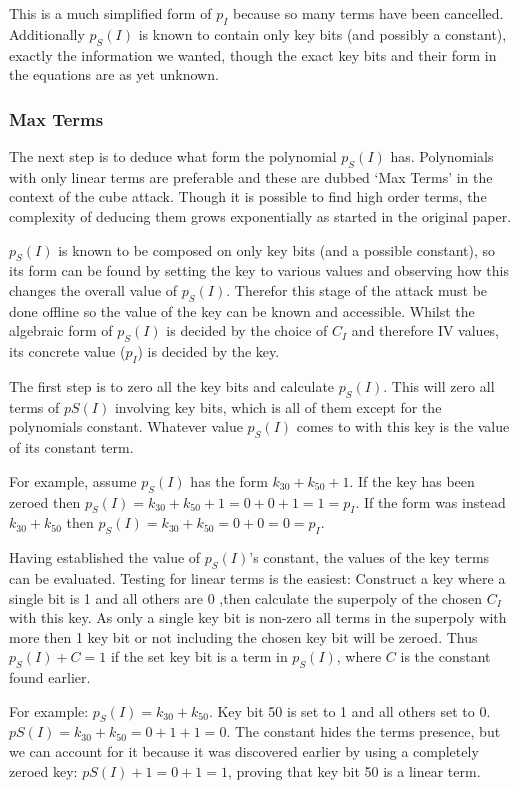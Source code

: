 \documentclass{report}
\let\Oldsubsubsection\subsubsection
\renewcommand{\subsubsection}{\FloatBarrier\Oldsubsubsection}
\begin{document}
This is a much simplified form of $p_I$ because so many terms have been cancelled. Additionally $p_S(I)$ is known to contain only key bits (and possibly a constant), exactly the information we wanted, though the exact key bits and their form in the equations are as yet unknown.

\subsubsection{Max Terms}
The next step is to deduce what form the polynomial $p_S(I)$ has. Polynomials with only linear terms are preferable and these are dubbed `Max Terms' in the context of the cube attack. Though it is possible to find high order terms, the complexity of deducing them grows exponentially as started in the original paper\cite{DinurShamir2009}.

$p_S(I)$ is known to be composed on only key bits (and a possible constant), so its form can be found by setting the key to various values and observing how this changes the overall value of $p_S(I)$. Therefor this stage of the attack must be done offline so the value of the key can be known and accessible. Whilst the algebraic form of $p_S(I)$ is decided by the choice of $C_I$ and therefore IV values, its concrete value ($p_I$) is decided by the key.

The first step is to zero all the key bits and calculate $p_S(I)$. This will zero all terms of $pS(I)$ involving key bits, which is all of them except for the polynomials constant. Whatever value $p_S(I)$ comes to with this key is the value of its constant term.

For example, assume $p_S(I)$ has the form $k_{30}+k_{50}+1$. If the key has been zeroed then $p_S(I)=k_{30}+k_{50}+1=0+0+1=1=p_I$. If the form was instead $k_{30}+k_{50}$ then $p_S(I)=k_{30}+k_{50}=0+0=0=p_I$.

Having established the value of $p_S(I)$'s constant, the values of the key terms can be evaluated. Testing for linear terms is the easiest: Construct a key where a single bit is 1 and all others are 0 ,then calculate the superpoly of the chosen $C_I$ with this key. As only a single key bit is non-zero all terms in the superpoly with more then 1 key bit or not including the chosen key bit will be zeroed. Thus $p_S(I)+C=1$ if the set key bit is a term in $p_S(I)$, where $C$ is the constant found earlier.

For example: $p_S(I)=k_{30}+k_{50}$. Key bit 50 is set to 1 and all others set to 0. $pS(I)=k_{30}+k_{50}=0+1+1=0$. The constant hides the terms presence, but we can account for it because it was discovered earlier by using a completely zeroed key: $pS(I)+1=0+1=1$, proving that key bit 50 is a linear term.
\end{document}
